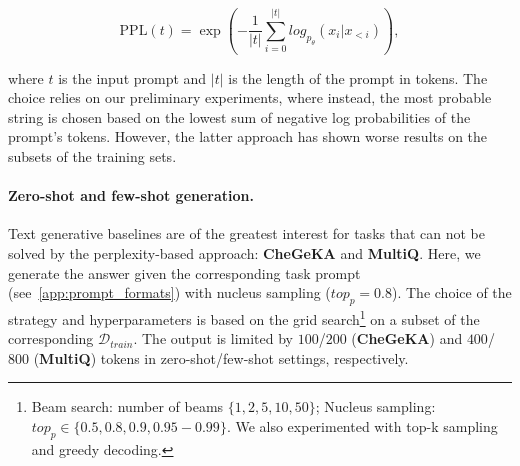 \documentclass[11pt]{article}
\begin{document}
\vspace{-0.5cm}
\begin{equation}
  \text{PPL}(t) = \exp(-\frac{1}{|t|}\sum_{i=0}^{|t|} 
log_{p_{\theta}}(x_i|x_{<i})),
\label{eqn:ppl}
\end{equation}


\noindent where $t$ is the input prompt and $|t|$ is the length of the prompt in tokens. The choice relies on our preliminary experiments, where instead, the most probable string is chosen based on the lowest sum of negative log probabilities of the prompt's tokens. However, the latter approach has shown worse results on the subsets of the training sets.

\paragraph{Zero-shot and few-shot generation.} Text generative baselines are of the greatest interest for tasks that can not be solved by the perplexity-based approach: \textbf{CheGeKA} and \textbf{MultiQ}. Here, we generate the answer given the corresponding task prompt (see~\autoref{app:prompt_formats}) with nucleus sampling ($top_p=0.8$). The choice of the strategy and hyperparameters is based on the grid search\footnote{Beam search: number of beams $\{1,2,5,10,50\}$; Nucleus sampling: $top_p \in \{0.5,0.8,0.9,0.95-0.99\}$. We also experimented with top-k sampling and greedy decoding.} on a subset of the corresponding $\mathcal{D}_{train}$. The output is limited by $100$/$200$ (\textbf{CheGeKA}) and $400$/$800$ (\textbf{MultiQ}) tokens in zero-shot/few-shot settings, respectively.
\end{document}
